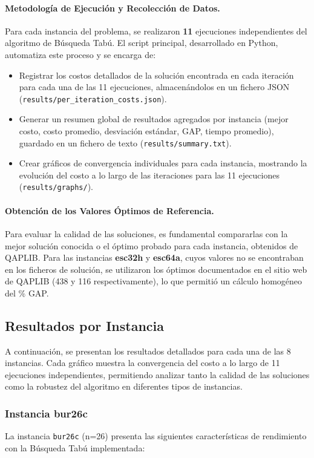 \documentclass[12pt, a4paper]{article}
\begin{document}
\paragraph{Metodología de Ejecución y Recolección de Datos.}
Para cada instancia del problema, se realizaron \textbf{11} ejecuciones independientes del algoritmo de Búsqueda Tabú. El script principal, desarrollado en Python, automatiza este proceso y se encarga de:
\begin{itemize}
    \item Registrar los costos detallados de la solución encontrada en cada iteración para cada una de las 11 ejecuciones, almacenándolos en un fichero JSON (\texttt{results/per\_iteration\_costs.json}).
    \item Generar un resumen global de resultados agregados por instancia (mejor costo, costo promedio, desviación estándar, GAP, tiempo promedio), guardado en un fichero de texto (\texttt{results/summary.txt}).
    \item Crear gráficos de convergencia individuales para cada instancia, mostrando la evolución del costo a lo largo de las iteraciones para las 11 ejecuciones (\texttt{results/graphs/}).
\end{itemize}

\paragraph{Obtención de los Valores Óptimos de Referencia.} Para evaluar la calidad de las soluciones, es fundamental compararlas con la mejor solución conocida o el óptimo probado para cada instancia, obtenidos de QAPLIB. Para las instancias \textbf{esc32h} y \textbf{esc64a}, cuyos valores no se encontraban en los ficheros de solución, se utilizaron los óptimos documentados en el sitio web de QAPLIB (438 y 116 respectivamente), lo que permitió un cálculo homogéneo del \% GAP.

\newpage
\subsection{Resultados por Instancia}

A continuación, se presentan los resultados detallados para cada una de las 8 instancias. Cada gráfico muestra la convergencia del costo a lo largo de 11 ejecuciones independientes, permitiendo analizar tanto la calidad de las soluciones como la robustez del algoritmo en diferentes tipos de instancias.

\subsubsection{Instancia bur26c}
La instancia \texttt{bur26c} (n=26) presenta las siguientes características de rendimiento con la Búsqueda Tabú implementada:
\end{document}
